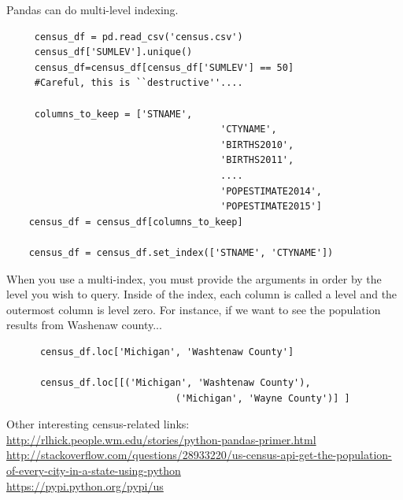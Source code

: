 \documentclass[11pt]{article}
\begin{document}
    Pandas can do multi-level indexing. 
    \begin{lstlisting}
     census_df = pd.read_csv('census.csv')
     census_df['SUMLEV'].unique()
     census_df=census_df[census_df['SUMLEV'] == 50]   
     #Careful, this is ``destructive''....

     columns_to_keep = ['STNAME',
                                      'CTYNAME',
                                      'BIRTHS2010',
                                      'BIRTHS2011', 
                                      ....
                                      'POPESTIMATE2014',
                                      'POPESTIMATE2015']
    census_df = census_df[columns_to_keep]

    census_df = census_df.set_index(['STNAME', 'CTYNAME'])
    \end{lstlisting}
    When you use a multi-index, you must provide the arguments in
    order by the level you wish to query. Inside of the index, each column
    is called a level and the outermost column is level zero. For
    instance, if we want to see the population results from Washenaw
    county...
    \begin{lstlisting}
      census_df.loc['Michigan', 'Washtenaw County']
      
      census_df.loc[[('Michigan', 'Washtenaw County'),
                              ('Michigan', 'Wayne County')] ]
    \end{lstlisting}
    Other interesting census-related links:\\
    \href{http://rlhick.people.wm.edu/stories/python-pandas-primer.html}{http://rlhick.people.wm.edu/stories/python-pandas-primer.html}\\
    \href{http://stackoverflow.com/questions/28933220/us-census-api-get-the-population-of-every-city-in-a-state-using-python}{http://stackoverflow.com/questions/28933220/us-census-api-get-the-population-of-every-city-in-a-state-using-python}\\
    \href{https://pypi.python.org/pypi/us}{https://pypi.python.org/pypi/us}\\
\end{document}
